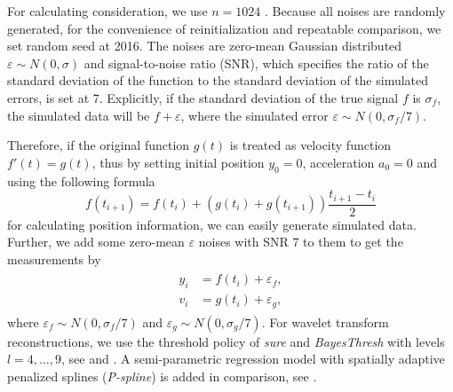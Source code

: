 For calculating consideration, we use $n=1024$ \cite{nason2010wavelet}. Because all noises are randomly generated, for the convenience of reinitialization and repeatable comparison, we set random seed at 2016. The noises are \iid zero-mean Gaussian distributed $\varepsilon \sim N(0,\sigma)$ and signal-to-noise ratio (SNR), which specifies the ratio of the standard deviation of the function to the standard deviation of the simulated errors, is set at 7. Explicitly, if the standard deviation of the true signal $f$ is $\sigma_f$, the simulated data will be $f+\varepsilon$, where the simulated error  $\varepsilon \sim N(0,\sigma_f/7)$. 

Therefore, if the original function $g(t)$ is treated as velocity function $f'(t)=g(t)$, thus by setting initial position $y_0=0$, acceleration $a_0=0$ and using the following formula 
\begin{equation}\label{generateVelocity}
f(t_{i+1})=f(t_i)+\left(g(t_i)+g(t_{i+1}) \right)\frac{t_{i+1}-t_i}{2}
\end{equation}
for calculating position information, we can easily generate simulated data. Further, we add some \iid  zero-mean $\varepsilon$ noises with SNR 7 to them to get the measurements by 
\begin{align}\label{tractorsplinegeneratefunctions}
\begin{split}
y_i &= f(t_i) + \varepsilon_f, \\
v_i &= g(t_i) + \varepsilon_g,
\end{split}
\end{align}
where $\varepsilon_f\sim N(0,\sigma_f/7)$ and $\varepsilon_g\sim N(0,\sigma_g/7)$. For wavelet transform reconstructions, we use the threshold policy of \textit{sure} and \textit{BayesThresh} with levels $l=4, \ldots, 9$, see  \cite{donoho1995adapting} and \cite{abramovich1998wavelet}. A semi-parametric regression model with spatially adaptive penalized splines (\textit{P-spline}) is added in comparison, see \cite{krivobokova2008fast} \cite{ruppert2003semiparametric}.

